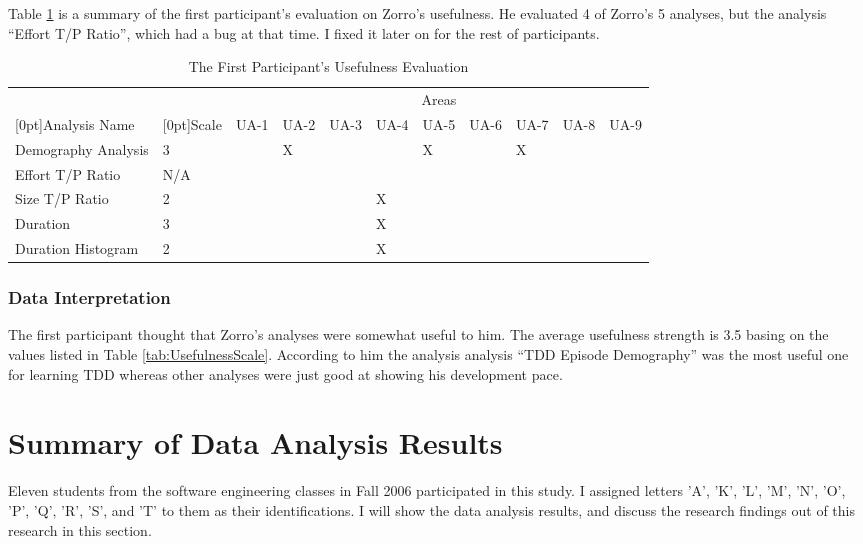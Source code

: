 Table \ref{tab:FirstUsefulness} is a summary of the first participant's 
evaluation on Zorro's usefulness. He evaluated 4 of Zorro's 5 analyses,  
but the analysis ``Effort T/P Ratio'', which had a bug at that time. 
I fixed it later on for the rest of participants.
\begin{table}[!ht]
\centering
  \begin{tabular}{|l|l|l|l|l|l|l|l|l|l|l|}
  \hline
           &      & \multicolumn{9}{c|}{Areas} \\ \cline{3-11}
    \raisebox{1.5ex}[0pt]{Analysis Name}   & \raisebox{1.5ex}[0pt]{Scale} 
       & UA-1 & UA-2 & UA-3 & UA-4 & UA-5 & UA-6 & UA-7 & UA-8 & UA-9   \\ \hline
    Demography Analysis & 3   &   & X &   &   & X &   & X &   &   \\ \hline       
    Effort T/P Ratio    & N/A &   &   &   &   &   &   &   &   &   \\ \hline
    Size T/P Ratio      & 2   &   &   &   & X &   &   &   &   &   \\ \hline
    Duration            & 3   &   &   &   & X &   &   &   &   &   \\ \hline
    Duration Histogram  & 2   &   &   &   & X &   &   &   &   &   \\ \hline
  \end{tabular}
  \caption{The First Participant's Usefulness Evaluation}\label{tab:FirstUsefulness}
\end{table}


\subsubsection{Data Interpretation}

The first participant thought that Zorro's analyses were somewhat useful 
to him. The average usefulness strength is 3.5 basing on the values listed in 
Table \ref{tab:UsefulnessScale}. According to him the analysis analysis 
``TDD Episode Demography'' was the most useful one for learning TDD 
whereas other analyses were just good at showing his development pace. 

\section{Summary of Data Analysis Results}
\label{sec:CaseStudyFindings}
Eleven students from the software engineering classes in Fall 2006
participated in this study. I assigned letters 'A', 'K', 'L',
'M', 'N', 'O', 'P', 'Q', 'R', 'S', and 'T' to them as their identifications.
I will show the data analysis results, and discuss the research 
findings out of this research in this section.

